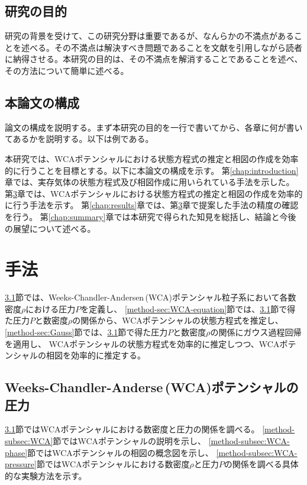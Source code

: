 \documentclass[titlepage]{jsreport}
\begin{document}
\section{研究の目的}

研究の背景を受けて、この研究分野は重要であるが、なんらかの不満点があることを述べる。その不満点は解決すべき問題であることを文献を引用しながら読者に納得させる。本研究の目的は、その不満点を解消することであることを述べ、その方法について簡単に述べる。

\section{本論文の構成}

論文の構成を説明する。まず本研究の目的を一行で書いてから、各章に何が書いてあるかを説明する。以下は例である。


本研究では、WCAポテンシャルにおける状態方程式の推定と相図の作成を効率的に行うことを目標とする。以下に本論文の構成を示す。
第\ref{chap:introduction}章では、実存気体の状態方程式及び相図作成に用いられている手法を示した。
第\ref{chap:method}章では、WCAポテンシャルにおける状態方程式の推定と相図の作成を効率的に行う手法を示す。
第\ref{chap:results}章では、第\ref{chap:method}章で提案した手法の精度の確認を行う。
第\ref{chap:summary}章では本研究で得られた知見を総括し、結論と今後の展望について述べる。


\chapter{手法} \label{chap:method}
\ref{method-sec:WCA-press}節では、Weeks-Chandler-Andersen\,(WCA)ポテンシャル粒子系において各数密度$\rho$における圧力$P$を定義し、
\ref{method-sec:WCA-equation}節では、\ref{method-sec:WCA-press}節で得た圧力$P$と数密度$\rho$の関係から、WCAポテンシャルの状態方程式を推定し、
\ref{method-sec:Gauss}節では、\ref{method-sec:WCA-press}節で得た圧力$P$と数密度$\rho$の関係にガウス過程回帰を適用し、
WCAポテンシャルの状態方程式を効率的に推定しつつ、WCAポテンシャルの相図を効率的に推定する。


\section{Weeks-Chandler-Anderse\,(WCA)ポテンシャルの圧力}\label{method-sec:WCA-press}
\ref{method-sec:WCA-press}節ではWCAポテンシャルにおける数密度と圧力の関係を調べる。
\ref{method-subsec:WCA}節ではWCAポテンシャルの説明を示し、
\ref{method-subsec:WCA-phase}節ではWCAポテンシャルの相図の概念図を示し、
\ref{method-subsec:WCA-pressure}節ではWCAポテンシャルにおける数密度$\rho$と圧力$P$の関係を調べる具体的な実験方法を示す。
\end{document}
